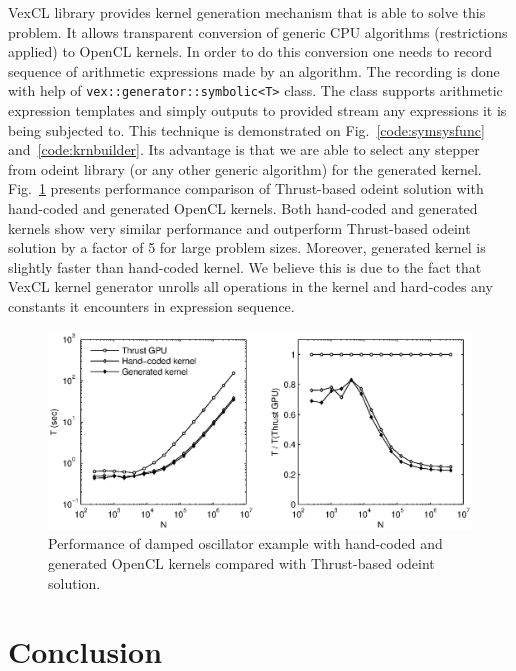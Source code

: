 \documentclass[1p]{elsarticle}
\newcommand{\code}[1]{\lstinline|#1|}
\newcommand{\figref}[1]{Fig.~\ref{#1}}
\begin{document}
VexCL library provides kernel generation mechanism that is able to solve this
problem. It allows transparent conversion of generic CPU algorithms
(restrictions applied) to OpenCL kernels. In order to do this conversion one
needs to record sequence of arithmetic expressions made by an algorithm.  The
recording is done with help of \code{vex::generator::symbolic<T>} class. The
class supports arithmetic expression templates and simply outputs to provided
stream any expressions it is being subjected to. This technique is demonstrated
on \figref{code:symsysfunc} and~\ref{code:krnbuilder}. Its advantage is that we
are able to select any stepper from odeint library (or any other generic
algorithm) for the generated kernel. \figref{fig:genkernel} presents
performance comparison of Thrust-based odeint solution with hand-coded and
generated OpenCL kernels. Both hand-coded and generated kernels show very
similar performance and outperform Thrust-based odeint solution by a factor of
5 for large problem sizes. Moreover, generated kernel is slightly faster than
hand-coded kernel. We believe this is due to the fact that VexCL kernel
generator unrolls all operations in the kernel and hard-codes any constants it
encounters in expression sequence.

\begin{figure}[p]
    \begin{center}
        \includegraphics[width=\textwidth]{data/damped_oscillator/genkernel}
    \end{center}
    \caption{Performance of damped oscillator example with hand-coded and
    generated OpenCL kernels compared with Thrust-based odeint solution.}
    \label{fig:genkernel}
\end{figure}

\section{Conclusion}
\end{document}
